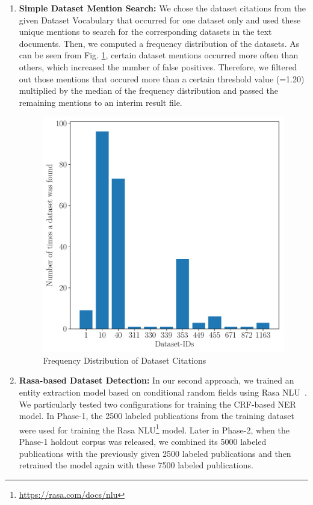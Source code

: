 \documentclass[runningheads]{llncs}
\begin{document}
\begin{enumerate}
    \item \textbf{Simple Dataset Mention Search:}
We chose the dataset citations from the given Dataset Vocabulary that occurred for one dataset only and used these unique mentions to search for the corresponding datasets in the text documents. Then, we computed a frequency distribution of the datasets. As can be seen from Fig. \ref{fig:graph}, certain dataset mentions occurred more often than others, which increased the number of false positives. Therefore, we filtered out those mentions that occured more than a certain threshold value (=1.20) multiplied by the median of the frequency distribution and passed the remaining mentions to an interim result file. 
\begin{figure}[!htb]
    \centering
    \includegraphics[scale=0.45]{images/freq.pdf}
    \caption{Frequency Distribution of Dataset Citations}
    \label{fig:graph}
\end{figure}
\item \textbf{Rasa-based Dataset Detection:}
In our second approach, we trained an entity extraction model based on conditional random fields using Rasa NLU~\cite{DBLP:journals/corr/abs-1712-05181}. We particularly tested two configurations for training the CRF-based NER model. In Phase-1, the 2500 labeled publications from the training dataset were used for training the Rasa NLU\footnote{\url{https://rasa.com/docs/nlu}} model. Later in Phase-2, when the Phase-1 holdout corpus was released, we combined its 5000 labeled publications with the previously given 2500 labeled publications and then retrained the model again with these 7500 labeled publications. %

\end{enumerate}
\end{document}
